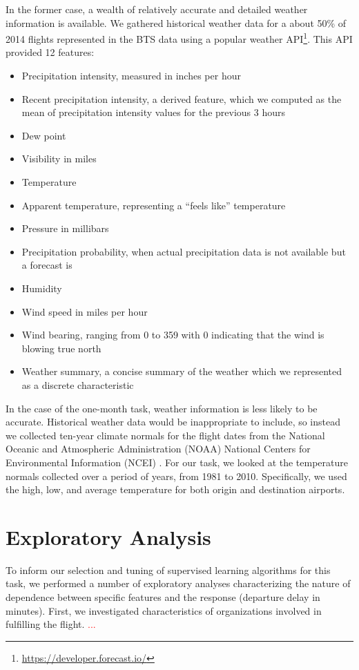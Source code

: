 \documentclass{article}
\begin{document}
In the former case, a wealth of relatively accurate and detailed weather information is available. We gathered historical weather data for a about 50\% of 2014 flights represented in the BTS data using a popular weather API\footnote{\url{https://developer.forecast.io/}}. This API provided 12 features:
\begin{itemize}
\item Precipitation intensity, measured in inches per hour
\item Recent precipitation intensity, a derived feature, which we computed as the mean of precipitation intensity values for the previous 3 hours
\item Dew point
\item Visibility in miles
\item Temperature
\item Apparent temperature, representing a ``feels like'' temperature
\item Pressure in millibars
\item Precipitation probability, when actual precipitation data is not available but a forecast is
\item Humidity
\item Wind speed in miles per hour
\item Wind bearing, ranging from 0 to 359 with 0 indicating that the wind is blowing true north
\item Weather summary, a concise summary of the weather which we represented as a discrete characteristic
\end{itemize}


In the case of the one-month task, weather information is less likely to be accurate. Historical weather data would be inappropriate to include, so instead we collected ten-year climate normals for the flight dates from the National Oceanic and Atmospheric Administration (NOAA) National Centers for Environmental Information (NCEI) \citep{noaaclimatedata}.  For our task, we looked at the temperature normals collected over a period of years, from 1981 to 2010. Specifically, we used the high, low, and average temperature for both origin and destination airports.

\section{Exploratory Analysis}
\label{sec:exploratory}

To inform our selection and tuning of supervised learning algorithms for this task, we performed a number of exploratory analyses characterizing the nature of dependence between specific features and the response (departure delay in minutes). First, we investigated characteristics of organizations involved in fulfilling the flight. \textcolor{red}{...}
\end{document}
